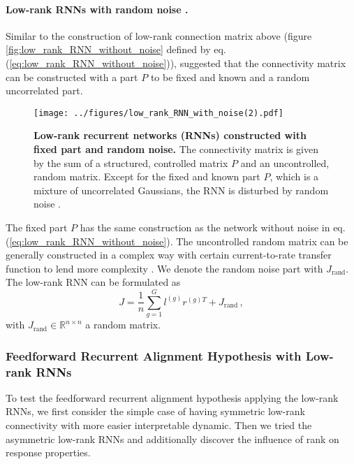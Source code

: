 \documentclass[11pt]{article}
\begin{document}
	\paragraph{Low-rank RNNs with random noise \cite{mastrogiuseppe2018linking}.}
	Similar to the construction of low-rank connection matrix above (figure \ref{fig:low_rank_RNN_without_noise} defined by eq.(\ref{eq:low_rank_RNN_without_noise})), \cite{mastrogiuseppe2018linking} suggested that the connectivity matrix can be constructed with a part $P$ to be fixed and known and a random uncorrelated part.
		\begin{figure} [H]
			\centering
			\texttt{[image: ../figures/low\_rank\_RNN\_with\_noise(2).pdf]}
			\caption[Low-rank recurrent networks (RNNs) constructed with fixed part and random noise]{\textbf{Low-rank recurrent networks (RNNs) constructed with fixed part and random noise.} The connectivity matrix is given by the sum of a structured, controlled matrix $P$ and an uncontrolled, random matrix. Except for the fixed and known part $P$, which is a mixture of uncorrelated Gaussians, the RNN is disturbed by random noise \cite{beiran2023parametric, mastrogiuseppe2018linking}.}
			\label{fig:low_rank_RNN_with_noise}
		\end{figure}
	The fixed part $P$ has the same construction as the network without noise in eq.(\ref{eq:low_rank_RNN_without_noise}). The uncontrolled random matrix can be generally constructed in a complex way with certain current-to-rate transfer function to lend more complexity \cite{mastrogiuseppe2018linking}. We denote the random noise part with $J_{\text{rand}}$. The low-rank RNN can be formulated as
		\begin{equation} \label{eq:low_rank_with_noise}
			J = \frac{1}{n} \sum_{g=1}^{G} l^{(g)} r^{(g)T} + J_{\text{rand}} \, ,
		\end{equation}
	with $J_{\text{rand}} \in \mathbb{R}^{n \times n}$ a random matrix. 
	
	\subsubsection{Feedforward Recurrent Alignment Hypothesis with Low-rank RNNs} \label{sec:ffrec_low_rank}
	To test the feedforward recurrent alignment hypothesis applying the low-rank RNNs, we first consider the simple case of having symmetric low-rank connectivity with more easier interpretable dynamic. Then we tried the asymmetric low-rank RNNs and additionally discover the influence of rank on response properties. 
	
\end{document}
